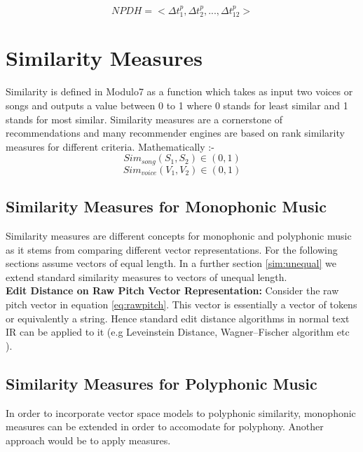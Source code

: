 \begin{equation} \label{NPDH}
NPDH = <\Delta t^p_1, \Delta t^p_2, ... , \Delta t^p_{12}>
\end{equation}


\section{Similarity Measures} \label{similarity}

\noindent Similarity is defined in Modulo7 as a function which takes as input two voices or songs and outputs a value between 0 to 1 where 0 stands for least similar and 1 stands for most similar. Similarity measures are a cornerstone of recommendations and many recommender engines are based on rank similarity measures for different criteria. Mathematically :-
\begin{equation}
Sim_{song}(S_1, S_2) \in (0, 1)
\end{equation}
\begin{equation}
Sim_{voice}(V_1, V_2) \in (0, 1)
\end{equation}

\subsection{Similarity Measures for Monophonic Music}

\noindent Similarity measures are different concepts for monophonic and polyphonic music as it stems from comparing different vector representations. For the following sections assume vectors of equal length. In a further section \ref{sim:unequal} we extend standard similarity measures to vectors of unequal length. \\

\noindent \textbf{Edit Distance on Raw Pitch Vector Representation:} Consider the raw pitch vector in equation \ref{eq:rawpitch}. This vector is essentially a vector of tokens or equivalently a string. Hence standard edit distance algorithms in normal text IR can be applied to it (e.g Leveinstein Distance, Wagner–Fischer algorithm etc \cite{simtour}).

\subsection{Similarity Measures for Polyphonic Music}

\noindent In order to incorporate vector space models to polyphonic similarity, monophonic measures can be extended in order to accomodate for polyphony. Another approach would be to apply measures.

